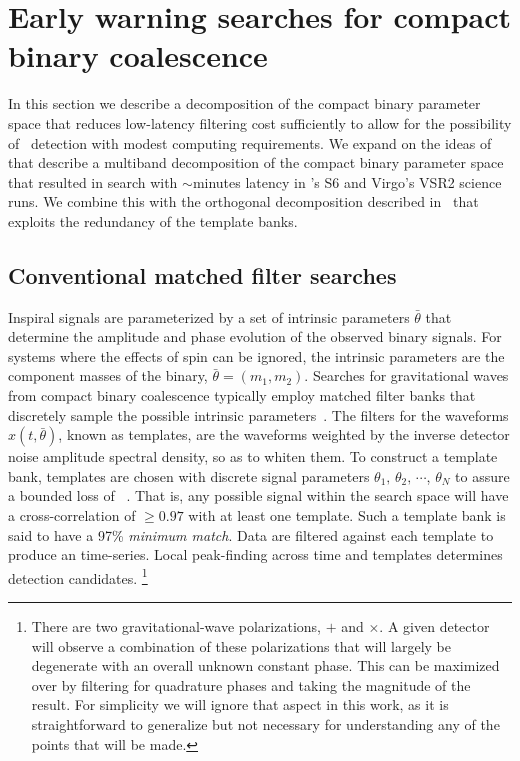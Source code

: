\section{Early warning searches for compact binary coalescence}
\label{SECII}\label{sec:method}

In this section we describe a decomposition of the compact binary parameter
space that reduces low-latency filtering cost sufficiently to allow for the
possibility of \earlywarning\ detection with modest computing requirements.  We
expand on the ideas of~\cite{Marion2004, Buskulic2010} that describe a
multiband decomposition of the compact binary parameter space that resulted in
search with $\sim$minutes latency in \LIGO{}'s S6 and Virgo's VSR2 science runs.
We combine this with the orthogonal decomposition described
in~\cite{Cannon:2010p10398} that exploits the redundancy of the template banks.

\subsection{Conventional \CBC{} matched filter searches}

Inspiral signals are parameterized by a set of intrinsic parameters
$\bar{\theta}$ that determine the amplitude and phase evolution of the observed
binary signals. For systems where the effects of spin can be ignored, the
intrinsic parameters are the component masses of the binary, $\bar{\theta} =
(m_1, m_2)$. Searches for gravitational waves from compact binary coalescence
typically employ matched filter banks that discretely
sample the possible intrinsic parameters~\cite{findchirppaper}.  The filters
for the waveforms $x(t,\bar{\theta})$, known as templates, are the waveforms
weighted by the inverse detector noise amplitude spectral density, so as to
whiten them. To construct a template bank, templates are chosen with discrete
signal parameters $\theta_1,\, \theta_2,\, \cdots$, $\theta_N$ to assure a
bounded loss of \SNR~\cite{Owen:1995tm,Owen:1998dk}. That is, any possible
signal within the search space will have a cross-correlation of $\geq0.97$ with
at least one template. Such a template bank is said to have a 97\% {\em
minimum match}. Data are filtered against each template to produce an \SNR{}
time-series. Local peak-finding across time and templates determines detection
candidates.
%
\footnote{There are two gravitational-wave polarizations, $+$ and $\times$. A
given detector will observe a combination of these polarizations that will
largely be degenerate with an overall unknown constant phase.  This can be
maximized over by filtering for quadrature phases and taking the magnitude of
the result. For simplicity we will ignore that aspect in this work, as it is
straightforward to generalize but not necessary for understanding any of the
points that will be made.}

